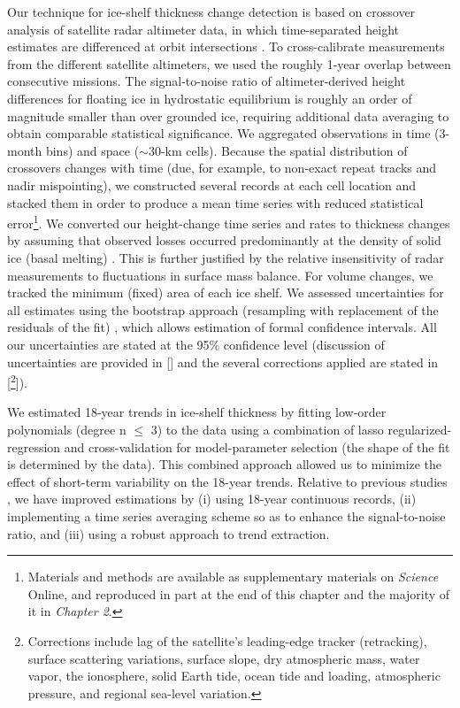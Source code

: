 \noindent
Our technique for ice-shelf thickness change detection is based on crossover
analysis of satellite radar altimeter data, in which time-separated height 
estimates are differenced at orbit intersections \parencite{Zwally2005, 
Davis2004, Wingham2009}. To cross-calibrate measurements from the different 
satellite altimeters, we used the roughly 1-year overlap between consecutive
missions. The signal-to-noise ratio of altimeter-derived height differences for
floating ice in hydrostatic equilibrium is roughly an order of magnitude 
smaller than over grounded ice, requiring additional data averaging to obtain
comparable statistical significance. We aggregated observations in time 
(3-month bins) and space ($\sim$30-km cells). Because the spatial distribution
of crossovers changes with time (due, for example, to non-exact repeat tracks
and nadir mispointing), we constructed several records at each cell location
and stacked them in order to produce a mean time series with reduced
statistical error\footnote{\label{SM}Materials and methods are available as 
supplementary materials on {\it Science} Online, and reproduced in part at the end of
this chapter and the majority of it in {\sl Chapter 2}.}. We converted our height-change time series and rates to
thickness changes by assuming that observed losses occurred predominantly at
the density of solid ice (basal melting) \parencite{Shepherd2010,
Pritchard2012, Wingham2009}. This is further justified by the relative
insensitivity of radar measurements to fluctuations in surface mass 
balance\footnotemark[1]. For volume changes, we tracked the minimum (fixed) area of
each ice shelf\footnotemark[1]. We assessed uncertainties for all estimates using
the bootstrap approach (resampling with replacement of the residuals of the
fit) \parencite{Efron1993}, which allows estimation of formal confidence
intervals. All our uncertainties are stated at the 95\% confidence level 
(discussion of uncertainties are provided in [\footnotemark[1]] and the several
corrections applied are stated in [\footnote{Corrections include lag of the
satellite's leading-edge tracker (retracking), surface scattering variations,
surface slope, dry atmospheric mass, water vapor, the ionosphere, solid Earth
tide, ocean tide and loading, atmospheric pressure, and regional sea-level
variation\footnotemark[1].}]).

We estimated 18-year trends in ice-shelf thickness by fitting low-order 
polynomials (degree n $\leqslant$ 3) to the data using a combination of lasso
regularized-regression \parencite{Tibshirani1996} and cross-validation for
model-parameter selection (the shape of the fit is determined by the data).
This combined approach allowed us to minimize the effect of short-term
variability on the 18-year trends. Relative to previous studies
\parencite{Shepherd2010, Pritchard2012, Zwally2005, Fricker2012}, we have
improved estimations by (i) using 18-year continuous records, (ii) implementing
a time series averaging scheme so as to enhance the signal-to-noise ratio, and
(iii) using a robust approach to trend extraction.

